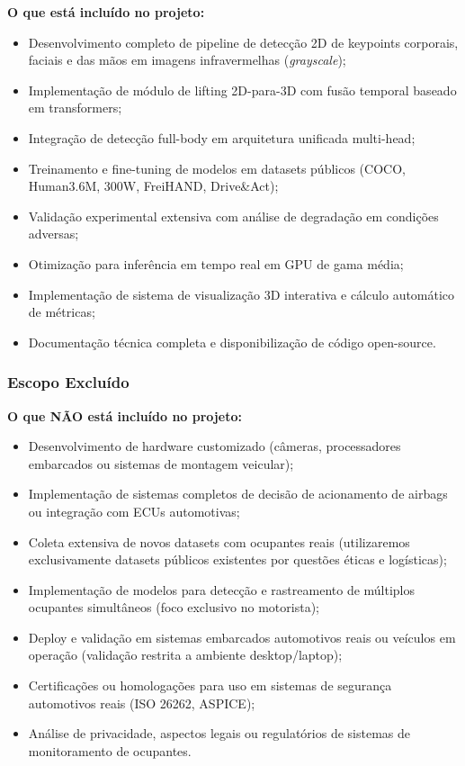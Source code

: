 \documentclass[12pt, a4paper]{article}
\begin{document}
\textbf{O que está incluído no projeto:}
\begin{itemize}
    \item Desenvolvimento completo de pipeline de detecção 2D de keypoints corporais, faciais e das mãos em imagens infravermelhas (\textit{grayscale});
    \item Implementação de módulo de lifting 2D-para-3D com fusão temporal baseado em transformers;
    \item Integração de detecção full-body em arquitetura unificada multi-head;
    \item Treinamento e fine-tuning de modelos em datasets públicos (COCO, Human3.6M, 300W, FreiHAND, Drive\&Act);
    \item Validação experimental extensiva com análise de degradação em condições adversas;
    \item Otimização para inferência em tempo real em GPU de gama média;
    \item Implementação de sistema de visualização 3D interativa e cálculo automático de métricas;
    \item Documentação técnica completa e disponibilização de código open-source.
\end{itemize}

\subsubsection{Escopo Excluído}

\textbf{O que NÃO está incluído no projeto:}
\begin{itemize}
    \item Desenvolvimento de hardware customizado (câmeras, processadores embarcados ou sistemas de montagem veicular);
    \item Implementação de sistemas completos de decisão de acionamento de airbags ou integração com ECUs automotivas;
    \item Coleta extensiva de novos datasets com ocupantes reais (utilizaremos exclusivamente datasets públicos existentes por questões éticas e logísticas);
    \item Implementação de modelos para detecção e rastreamento de múltiplos ocupantes simultâneos (foco exclusivo no motorista);
    \item Deploy e validação em sistemas embarcados automotivos reais ou veículos em operação (validação restrita a ambiente desktop/laptop);
    \item Certificações ou homologações para uso em sistemas de segurança automotivos reais (ISO 26262, ASPICE);
    \item Análise de privacidade, aspectos legais ou regulatórios de sistemas de monitoramento de ocupantes.
\end{itemize}
\end{document}

